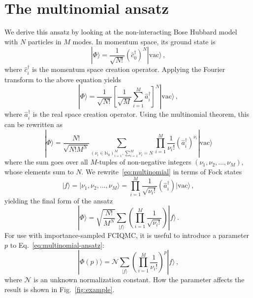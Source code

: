 \documentclass[11pt, article]{amsart}
\def\vac{| \mathrm{vac} \rangle}
\begin{document}
\section{The multinomial ansatz}

We derive this ansatz by looking at the non-interacting Bose Hubbard model with $N$ particles in $M$ modes. In momentum space, its ground state is
%
\begin{equation}
  | \Phi \rangle = \frac{1}{\sqrt{N!}}{\left(\hat{c}^\dagger_0\right)}^N \vac\,,
\end{equation}
%
where $\hat{c}^\dagger_i$ is the momentum space creation operator. Applying the Fourier transform to the above equation yields
%
\begin{equation}
  | \Phi \rangle = \frac{1}{\sqrt{N!}}{\left[\frac{1}{\sqrt{M}}\sum_{i=1}^M \hat{a}^\dagger_i\right]}^N \vac\,,
\end{equation}
%
where $\hat{a}^\dagger_i$ is the real space creation operator. Using the multinomial theorem, this can be rewritten as
%
\begin{equation}\label{eq:multinomial}
  | \Phi \rangle = \frac{N!}{\sqrt{N!M^N}}
  \sum_{(\nu_i \in \mathbb{N}_0)_{i=1}^M, \sum_{i=1}^M\nu_i=N}
  \prod_{i=1}^{M}\frac{1}{\nu_i!}{\left(\hat{a}^\dagger_i\right)}^{\nu_i}\vac
\end{equation}
%
where the sum goes over all $M$-tuples of non-negative integers $(\nu_1, \nu_2, \dots, \nu_M)$, whose elements sum to $N$. We rewrite~\eqref{eq:multinomial} in terms of Fock states
%
\begin{equation}
  |f\rangle = |\nu_1, \nu_2, \dots, \nu_M\rangle = \prod_{i=1}^M\frac{1}{\sqrt{\nu_i!}}\left(\hat{a}_i^\dagger\right)\vac\,,
\end{equation}
%
yielding the final form of the ansatz
%
\begin{equation}\label{eq:multinomial-ansatz}
  |\Phi\rangle = \sqrt{\frac{N!}{M^N}}\sum_{|f\rangle}\left(\prod_{i=1}^{M}\frac{1}{\sqrt{\nu_i!}}\right)|f\rangle\,.
\end{equation}
%
For use with importance-sampled FCIQMC, it is useful to introduce a parameter $p$ to Eq.~\eqref{eq:multinomial-ansatz}:
%
\begin{equation}\label{eq:multinomial-ansatz-p}
|\Phi(p)\rangle =  \mathcal{N}\sum_{|f\rangle}\left(\prod_{i=1}^{M}\frac{1}{\nu_i!}\right)^p|f\rangle\,,
\end{equation}
%
where $\mathcal{N}$ is an unknown normalization constant. How the parameter affects the result is shown in Fig.~\ref{fig:example}.
\end{document}

